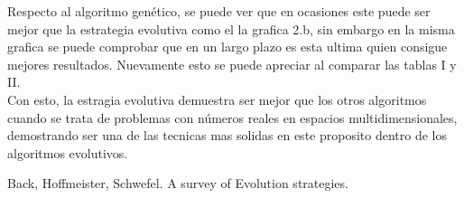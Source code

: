 \documentclass[twocolumn]{IEEEtran}
\begin{document}
Respecto al algoritmo genético, se puede ver que en ocasiones este puede ser mejor que la
estrategia evolutiva como el la grafica 2.b, sin embargo en la misma 
grafica se puede comprobar que en un largo plazo es esta ultima quien consigue mejores resultados.
Nuevamente esto se puede apreciar al comparar las tablas I y
II. \\

Con esto, la estragia evolutiva demuestra ser mejor que los otros algoritmos cuando se trata de 
problemas con números reales en espacios multidimensionales, demostrando ser una de las tecnicas
mas solidas en este proposito dentro de los algoritmos evolutivos.

\begin{thebibliography}{X}
    \item Back, Hoffmeister, Schwefel. A survey of Evolution strategies.
\end{thebibliography}
\end{document}
